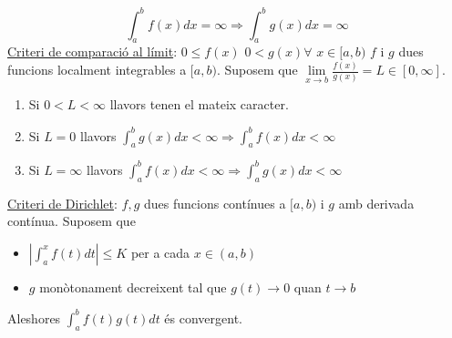 \documentclass[../main.tex]{subfiles}
\begin{document}
    \begin{displaymath}
        \int_a^b f(x)dx = \infty \Rightarrow \int_a^b g(x) dx = \infty
    \end{displaymath}
    \underline{Criteri de comparació al límit}: $0 \leq f(x)$ $0 < g(x) \forall$ $x \in [a, b)$ $f$ i $g$ dues funcions localment integrables a $[a, b)$. Suposem que $\lim\limits_{x \rightarrow b} \frac{f(x)}{g(x)} = L \in [0, \infty]$.\\
    \begin{enumerate}
        \item Si $0 < L < \infty$ llavors tenen el mateix caracter.
        \item Si $L = 0$ llavors $\int_a^b g(x) dx < \infty \Rightarrow \int_a^b f(x) dx < \infty$
        \item Si $L = \infty$ llavors $\int_a^b f(x) dx < \infty \Rightarrow \int_a^b g(x) dx < \infty$
    \end{enumerate}
    \underline{Criteri de Dirichlet}: $f, g$ dues funcions contínues a $[a, b)$ i $g$ amb derivada contínua. Suposem que \begin{itemize}
        \item $|\int_a^x f(t) dt| \leq K$ per a cada $x \in (a, b)$
        \item $g$ monòtonament decreixent tal que $g(t) \longrightarrow 0$ quan $t \rightarrow b$
    \end{itemize}
    Aleshores $\int_a^b f(t) g(t) dt$ és convergent.\\
\end{document}
